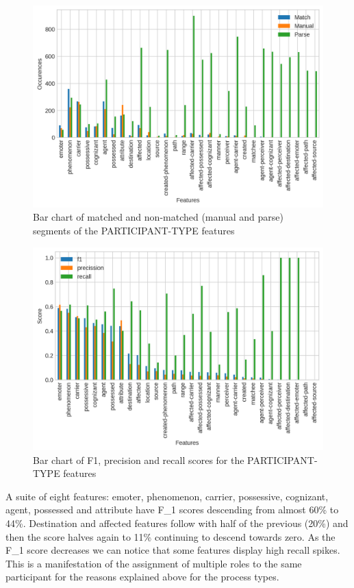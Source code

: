 \begin{figure}[!ht]
    \centering
    \includegraphics[width=.995\textwidth]{evaluation-results/figures/accuracy-semantic-participant-type1}
    \caption{Bar chart of matched and non-matched (manual and parse) segments of the PARTICIPANT-TYPE features}
    \label{fig:participant-roles}
\end{figure}
\begin{figure}[!ht]
    \centering
    \includegraphics[width=.995\textwidth]{evaluation-results/figures/accuracy-semantic-participant-type1-f1}
    \caption{Bar chart of F1, precision and recall scores for the PARTICIPANT-TYPE features}
    \label{fig:participant-roles-f1}
\end{figure}

A suite of eight features: emoter, phenomenon, carrier, possessive, cognizant, agent, possessed and attribute have F_1 scores descending from almost 60\% to 44\%. Destination and affected features follow with half of the previous (20\%) and then the score halves again to 11\% continuing to descend towards zero. As the F_1 score decreases we can notice that some features display high recall spikes. This is a manifestation of the assignment of multiple roles to the same participant for the reasons explained above for the process types. 

